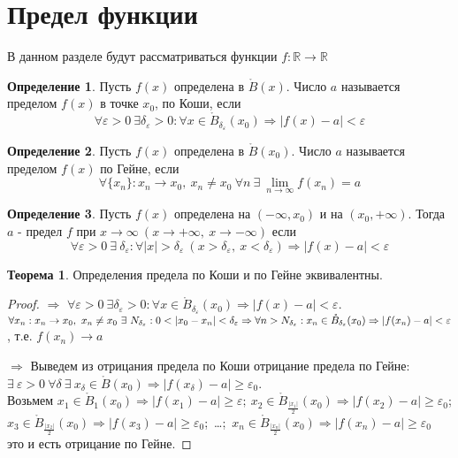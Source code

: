 \documentclass[a4paper, 12pt]{article}
\newcommand{\R}{\mathbb{R}}
\newcommand{\Bo}{\mathring{B}}
\renewcommand{\epsilon}{\varepsilon}
\newcommand\tab[1][.5cm]{\hspace*{#1}}
\newcommand{\lims}{\lim\limits_{n\to \infty}}
\theoremstyle{definition}
\newtheorem*{definition}{Определение}
\newtheorem*{theorem}{Теорема}
\begin{document}
        \section{Предел функции}
        В данном разделе будут рассматриваться функции $f: \R\to\R$
        \begin{definition}
            Пусть $f(x)$ определена в $\Bo (x)$. Число $a$ называется пределом $f(x)$ в точке $x_0$, по Коши, если  
            \[\forall \epsilon>0\ \exists \delta_{\epsilon}>0: \forall x\in \Bo_{\delta_{\epsilon}}(x_0) \Rightarrow |f(x)-a|<\epsilon\]
        \end{definition} 
        \begin{definition}
            Пусть $f(x)$ определена в $\Bo(x_0)$. Число $a$ называется пределом $f(x)$ по Гейне, если
            \[\forall \{x_n\}: x_n\to x_0,\ x_n\ne x_0\ \forall n\ \exists\ \lims f(x_n)=a\]
        \end{definition} 
        \begin{definition}
            Пусть $f(x)$ определена на $(-\infty, x_0)$ и на $(x_0, +\infty)$. Тогда $a$ - предел $f$ при $x\to \infty\ (x\to +\infty,\ x\to -\infty)$ если 
            \[\forall \epsilon>0\ \exists\ \delta_{\epsilon}: \forall |x|>\delta_{\epsilon}\ (x>\delta_{\epsilon},\ x<\delta_{\epsilon}) \Rightarrow |f(x)-a|<\epsilon\]
        \end{definition} 
        \begin{theorem} 
            Определения предела по Коши и по Гейне эквивалентны.
        \end{theorem} 
        \begin{proof}\tab
                \item[\text{(К)}$\Rightarrow$\text{(Г):}] $\forall \epsilon>0\ \exists \delta_{\epsilon}>0: \forall x\in \Bo_{\delta_{\epsilon}}(x_0) \Rightarrow |f(x)-a|<\epsilon$.\\
                $\forall x_n: x_n\to x_0,\ x_n\ne x_0\ \exists\ N_{\delta_{\epsilon}}: 0<|x_0-x_n|<\delta_{\epsilon} \Rightarrow \forall n> N_{\delta_{\epsilon}}: x_n\in \Bo_{\delta_{\epsilon}}(x_0)\\
                \Rightarrow |f(x_n)-a|<\epsilon$, т.е. $f(x_n)\to a$    
                \item[\text{(Г)}$\Rightarrow$\text{(К):}] Выведем из отрицания предела по Коши отрицание предела по Гейне:\\
                $\exists\ \epsilon> 0\ \forall \delta\ \exists\ x_{\delta}\in \Bo(x_0) \Rightarrow |f(x_{\delta})-a|\geq \epsilon_0$.\\
                Возьмем $x_1 \in \Bo_1(x_0) \Rightarrow |f(x_1)-a|\geq \epsilon;\ x_2 \in \Bo_{\frac{|x_1|}{2}}(x_0) \Rightarrow |f(x_2)-a|\geq \epsilon_0$;\\
                $x_3\in \Bo_{\frac{|x_2|}{2}}(x_0) \Rightarrow |f(x_3)-a|\geq \epsilon_0$;\ \dots;\ $x_n \in \Bo_{\frac{|x_n|}{2}}(x_0) \Rightarrow |f(x_n)-a|\geq \epsilon_0$\\
                это и есть отрицание по Гейне.
        \end{proof} 
\end{document}
